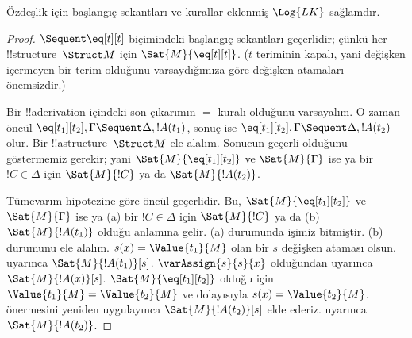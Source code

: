 \documentclass[../../../include/open-logic-section]{subfiles}
\begin{document}


\begin{prop}
Özdeşlik için başlangıç sekantları ve kurallar eklenmiş $\Log{LK}$ sağlamdır.
\end{prop}

\begin{proof}
${}\Sequent\eq[t][t]$ biçimindeki başlangıç sekantları geçerlidir; çünkü her
!!{structure}~$\Struct M$ için $\Sat{M}{\eq[t][t]}$. ($t$ teriminin kapalı,
yani değişken içermeyen bir terim olduğunu varsaydığımıza göre değişken
atamaları önemsizdir.)

Bir !!a{derivation} içindeki son çıkarımın $=$ kuralı olduğunu varsayalım. O zaman
öncül $\eq[t_1][t_2],\Gamma\Sequent\Delta,!A(t_1)$, sonuç ise
$\eq[t_1][t_2],\Gamma\Sequent\Delta,!A(t_2)$ olur. Bir
!!a{structure}~$\Struct M$ ele alalım. Sonucun geçerli olduğunu göstermemiz
gerekir; yani $\Sat{M}{\eq[t_1][t_2]}$ ve $\Sat{M}{\Gamma}$ ise ya bir
$!C\in\Delta$ için $\Sat{M}{!C}$ ya da $\Sat{M}{!A(t_2)}$.

Tümevarım hipotezine göre öncül geçerlidir. Bu, $\Sat{M}{\eq[t_1][t_2]}$
ve $\Sat{M}{\Gamma}$ ise ya (a) bir $!C\in\Delta$ için $\Sat{M}{!C}$ ya da
(b) $\Sat{M}{!A(t_1)}$ olduğu anlamına gelir. (a) durumunda işimiz bitmiştir.
(b) durumunu ele alalım. $s(x)=\Value{t_1}{M}$ olan bir $s$ değişken ataması
olsun.  uyarınca
$\Sat{M}{!A(t_1)}[s]$. $\varAssign{s}{s}{x}$ olduğundan
 uyarınca $\Sat{M}{!A(x)}[s]$.
$\Sat{M}{\eq[t_1][t_2]}$ olduğu için $\Value{t_1}{M}=\Value{t_2}{M}$ ve
dolayısıyla $s(x)=\Value{t_2}{M}$. 
önermesini yeniden uygulayınca $\Sat{M}{!A(t_2)}[s]$ elde ederiz.
 uyarınca $\Sat{M}{!A(t_2)}$.
\end{proof}
\end{document}
